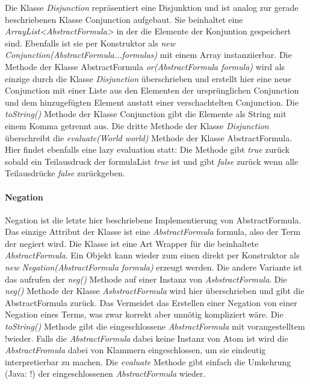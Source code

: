 \documentclass[12pt,a4paper]{article}
\begin{document}
Die Klasse \textit{Disjunction} repräsentiert eine Disjunktion und ist analog zur gerade beschriebenen Klasse Conjunction aufgebaut. Sie beinhaltet eine \textit{ArrayList<AbstractFormula>} in der die Elemente der Konjuntion gespeichert sind. Ebenfalls ist sie per Konstruktor als \textit{new Conjunction(AbstractFormula...formulas)}  mit einem Array instanziierbar. Die Methode der Klasse AbstractFormula \textit{or(AbstractFormula formula)} wird als einzige durch die Klasse \textit{Disjunction} überschrieben und erstellt hier eine neue Conjunction mit einer Liste aus den Elementen der ursprünglichen Conjunction und dem hinzugefügten Element anstatt einer verschachtelten Conjunction. Die \textit{toString()} Methode der Klasse Conjunction gibt die Elemente als String mit einem Komma getrennt aus. Die dritte Methode der Klasse \textit{Disjunction} überschreibt die \textit{evaluate(World world)} Methode der Klasse AbstractFormula. Hier findet ebenfalls eine lazy evaluation statt: Die Methode gibt \textit{true} zurück sobald ein Teilausdruck der formulaList \textit{true} ist und gibt \textit{false} zurück wenn alle Teilausdrücke \textit{false} zurückgeben.


\paragraph{Negation} \mbox{}


Negation ist die letzte hier beschriebene Implementierung von AbstractFormula. Das einzige Attribut der Klasse ist eine \textit{AbstractFormula} formula, also der Term der negiert wird. Die Klasse ist eine Art Wrapper für die beinhaltete \textit{AbstractFormula}. Ein Objekt kann wieder zum einen direkt per Konstruktor als \textit{new Negation(AbstractFormula formula)} erzeugt werden. Die andere Variante ist das aufrufen der \textit{neg()} Methode auf einer Instanz von \textit{AsbstractFormula}. Die \textit{neg()} Methode der Klasse \textit{AsbstractFormula} wird hier überschrieben und gibt die AbstractFormula zurück. Das Vermeidet das Erstellen einer Negation von einer Negation eines Terms, was zwar korrekt aber unnötig kompliziert wäre. Die \textit{toString()} Methode gibt die eingeschlossene \textit{AbstractFormula} mit vorangestelltem \glqq !\grqq \space  wieder. Falls die \textit{AbstractFormula} dabei keine Instanz von Atom ist wird die \textit{AbstractFromula} dabei von Klammern eingeschlossen, um sie eindeutig interpretierbar zu machen. Die \textit{evaluate} Methode gibt einfach die Umkehrung (Java: \glqq !\grqq) der eingeschlossenen \textit{AbstractFormula} wieder.
\end{document}
